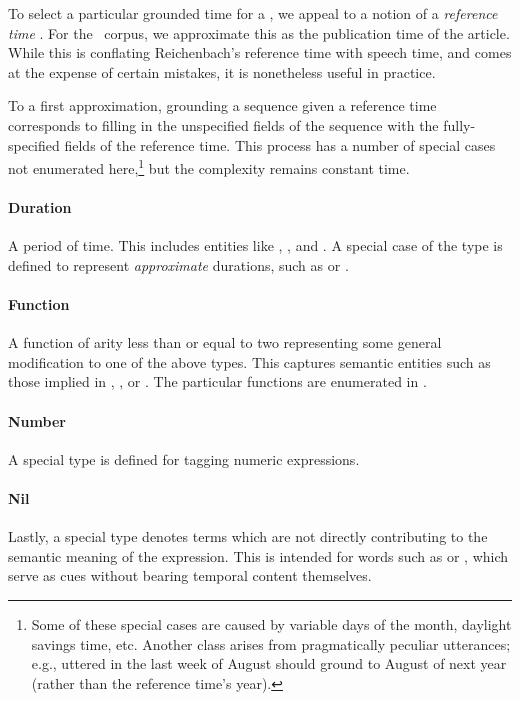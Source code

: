To select a particular grounded time for a , 
  we appeal to a notion of a
  \textit{reference time} \cite{key:1947reichenback-temporal}.
For the \tempeval\ corpus, we approximate this as the
	publication time of the article.
While this is conflating Reichenbach's reference time with speech time, 
  and comes at the expense of certain mistakes,
	it is nonetheless useful in practice.

To a first approximation, grounding a sequence given a reference time
  corresponds to filling in the unspecified fields of the sequence with the
  fully-specified fields of the reference time.
This process has a number of special
  cases not enumerated here,\footnote{
    Some of these special cases are caused by variable days of the month,
      daylight savings time, etc.
    Another class arises from pragmatically peculiar utterances; e.g.,
       uttered in the last week of August
      should ground to August of next year (rather than the reference time's
      year).
  }
  but the complexity remains constant time.
	
\paragraph{Duration}
A period of time.
This includes entities like , , and .
A special case of the  type is defined to represent 
	\textit{approximate} durations, such as  or
	.

\paragraph{Function}
A function of arity less than or equal to two representing some
	general modification to one of the above types.
This captures semantic entities such as those implied in
	, 
	, or .
The particular functions are enumerated in 
	.

\paragraph{Number}
A special  type is defined for tagging numeric expressions.

\paragraph{Nil}
Lastly, a special  type denotes terms which are not
	directly contributing to the semantic meaning of the expression.
This is intended for words such as  or , which serve as cues
	without bearing temporal content themselves.



